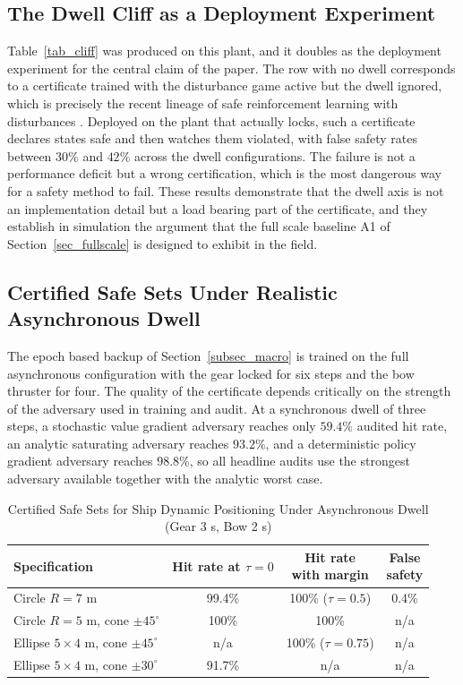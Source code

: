 \documentclass[journal]{IEEEtran}
\begin{document}
\subsection{The Dwell Cliff as a Deployment Experiment}

Table~\ref{tab_cliff} was produced on this plant, and it doubles as the deployment experiment for the central claim of the paper. The row with no dwell corresponds to a certificate trained with the disturbance game active but the dwell ignored, which is precisely the recent lineage of safe reinforcement learning with disturbances \cite{li2023cdc,yu2022}. Deployed on the plant that actually locks, such a certificate declares states safe and then watches them violated, with false safety rates between $30\%$ and $42\%$ across the dwell configurations. The failure is not a performance deficit but a wrong certification, which is the most dangerous way for a safety method to fail. These results demonstrate that the dwell axis is not an implementation detail but a load bearing part of the certificate, and they establish in simulation the argument that the full scale baseline A1 of Section~\ref{sec_fullscale} is designed to exhibit in the field.

\subsection{Certified Safe Sets Under Realistic Asynchronous Dwell}

The epoch based backup of Section~\ref{subsec_macro} is trained on the full asynchronous configuration with the gear locked for six steps and the bow thruster for four. The quality of the certificate depends critically on the strength of the adversary used in training and audit. At a synchronous dwell of three steps, a stochastic value gradient adversary reaches only $59.4\%$ audited hit rate, an analytic saturating adversary reaches $93.2\%$, and a deterministic policy gradient adversary reaches $98.8\%$, so all headline audits use the strongest adversary available together with the analytic worst case.

\begin{table}[!t]
\renewcommand{\arraystretch}{1.4}
\caption{Certified Safe Sets for Ship Dynamic Positioning Under Asynchronous Dwell (Gear 3 s, Bow 2 s)}
\label{tab_ship_sets}
\centering
\begin{tabular}{lccc}
\toprule
Specification & \makecell{Hit rate\\at $\tau=0$} & \makecell{Hit rate\\with margin} & \makecell{False\\safety} \\
\midrule
Circle $R=7$ m & 99.4\% & 100\% ($\tau{=}0.5$) & 0.4\% \\
Circle $R=5$ m, cone $\pm45^\circ$ & 100\% & 100\% & n/a \\
Ellipse $5{\times}4$ m, cone $\pm45^\circ$ & n/a & 100\% ($\tau{=}0.75$) & n/a \\
Ellipse $5{\times}4$ m, cone $\pm30^\circ$ & 91.7\% & n/a & n/a \\
\bottomrule
\end{tabular}
\end{table}
\end{document}
